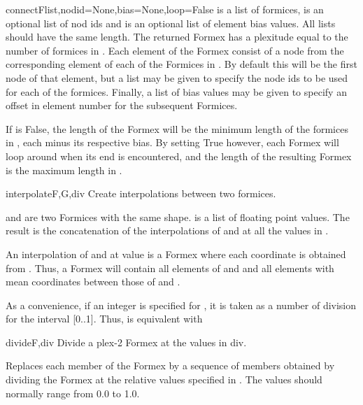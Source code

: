 {{\begin{funcdesc}{connect}{Flist,nodid=None,bias=None,loop=False}
 is a list of formices,  is an optional list of nod ids and  is an optional list of element bias values. All lists should have the same length. The returned Formex has a plexitude equal to the number of formices in . Each element of the Formex consist of a node from the corresponding element of each of the Formices in . By default this will be the first node of that element, but a  list may be given to specify the node ids to be used for each of the formices. Finally, a list of bias values may be given to specify an offset in element number for the subsequent Formices.

If  is False, the length of the Formex will be the minimum length of the formices in , each minus its respective bias. By setting  True however, each Formex will loop around when its end is encountered, and the length of the resulting Formex is the maximum length in .
\end{funcdesc}


\begin{funcdesc}{interpolate}{F,G,div}
Create interpolations between two formices.

 and  are two Formices with the same shape.
 is a list of floating point values.
The result is the concatenation of the interpolations of  and  at all the values in .

An interpolation of  and  at value  is a Formex  where each coordinate  is obtained from  .
Thus, a Formex  will contain all elements
of  and  and all elements with mean coordinates between those of  and .

As a convenience, if an integer is specified for , it is taken as a
number of division for the interval [0..1].
Thus,  is equivalent with
\end{funcdesc}


\begin{funcdesc}{divide}{F,div}
Divide a plex-2 Formex at the values in div.

Replaces each member of the Formex  by a sequence of members obtained
by dividing the Formex at the relative values specified in . The values
should normally range from 0.0 to 1.0.
    

\end{funcdesc}}}
